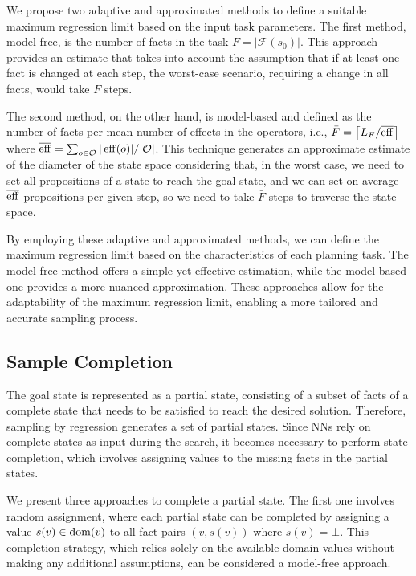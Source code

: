 We propose two adaptive and approximated methods to define a suitable maximum regression limit based on the input task parameters. The first method, model-free, is the number of facts in the task $F=|\mathcal{F}(s_0)|$. This approach provides an estimate that takes into account the assumption that if at least one fact is changed at each step, the worst-case scenario, requiring a change in all facts, would take $F$ steps.

The second method, on the other hand, is model-based and defined as the number of facts per mean number of effects in the operators, i.e., $\bar F=\left\lceil L_F/\overline{\operatorname{eff}}\right\rceil$ where $\overline{\operatorname{eff}}=\sum_{o\in \mathcal{O}} |\operatorname{eff}(o)|/|\mathcal{O}|$. This technique generates an approximate estimate of the diameter of the state space considering that, in the worst case, we need to set all propositions of a state to reach the goal state, and we can set on average $\overline{\operatorname{eff}}$ propositions per given step, so we need to take $\bar F$ steps to traverse the state space.

By employing these adaptive and approximated methods, we can define the maximum regression limit based on the characteristics of each planning task. The model-free method offers a simple yet effective estimation, while the model-based one provides a more nuanced approximation. These approaches allow for the adaptability of the maximum regression limit, enabling a more tailored and accurate sampling process.

\subsection{Sample Completion}
\label{sec:sample-completion}

The goal state is represented as a partial state, consisting of a subset of facts of a complete state that needs to be satisfied to reach the desired solution. Therefore, sampling by regression generates a set of partial states. Since NNs rely on complete states as input during the search, it becomes necessary to perform state completion, which involves assigning values to the missing facts in the partial states.

We present three approaches to complete a partial state. The first one involves random assignment, where each partial state can be completed by assigning a value $s(v)\in\operatorname{dom}(v)$ to all fact pairs $(v,s(v))$ where $s(v)=\bot$. This completion strategy, which relies solely on the available domain values without making any additional assumptions, can be considered a model-free approach.

